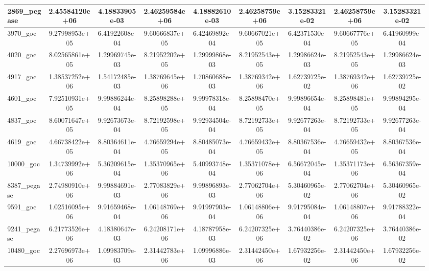\documentclass{standalone}
\begin{document}
\begin{tabular}{|l|cc|cc|cc|cc|}
2869\_pegase 
& 2.45584120e+06
& 4.18833905e-03
& 2.46259584e+06
& 4.18882610e-03
& 2.46258759e+06
& 3.15283321e-02
& 2.46258759e+06
& 3.15283321e-02
\\
\hline
3970\_goc 
& 9.27998953e+05
& 6.41922608e-04
& 9.60666837e+05
& 6.42469892e-04
& 9.60667021e+05
& 6.42371530e-04
& 9.60667776e+05
& 6.41960999e-04
\\

4020\_goc 
& 8.02565861e+05
& 1.29969745e-03
& 8.21952202e+05
& 1.29999868e-03
& 8.21952543e+05
& 1.29986624e-03
& 8.21952543e+05
& 1.29986624e-03
\\

4917\_goc 
& 1.38537252e+06
& 1.54172485e-03
& 1.38769645e+06
& 1.70860688e-03
& 1.38769342e+06
& 1.62739725e-02
& 1.38769342e+06
& 1.62739725e-02
\\

4601\_goc 
& 7.92510931e+05
& 9.99886244e-04
& 8.25898288e+05
& 9.99978318e-04
& 8.25898470e+05
& 9.99896654e-04
& 8.25898481e+05
& 9.99894295e-04
\\

4837\_goc 
& 8.60071647e+05
& 9.92673673e-04
& 8.72192598e+05
& 9.92934504e-04
& 8.72192733e+05
& 9.92677263e-04
& 8.72192733e+05
& 9.92677263e-04
\\
\hline
4619\_goc 
& 4.66738422e+05
& 8.80364611e-04
& 4.76659294e+05
& 8.80485073e-04
& 4.76659432e+05
& 8.80367536e-04
& 4.76659432e+05
& 8.80367536e-04
\\

10000\_goc 
& 1.34739992e+06
& 5.36209615e-04
& 1.35370965e+06
& 5.40993748e-04
& 1.35371078e+06
& 6.56672045e-04
& 1.35371173e+06
& 6.56367359e-04
\\

8387\_pegase 
& 2.74980910e+06
& 9.99884691e-03
& 2.77083829e+06
& 9.99896893e-03
& 2.77062704e+06
& 5.30460965e-02
& 2.77062704e+06
& 5.30460965e-02
\\

9591\_goc 
& 1.02516095e+06
& 9.91659468e-04
& 1.06148769e+06
& 9.91997903e-04
& 1.06148806e+06
& 9.91795084e-04
& 1.06148807e+06
& 9.91788322e-04
\\

9241\_pegase 
& 6.21773526e+06
& 4.18380647e-03
& 6.24208171e+06
& 4.18787958e-03
& 6.24207325e+06
& 3.76440386e-02
& 6.24207325e+06
& 3.76440386e-02
\\
\hline
10480\_goc 
& 2.27696973e+06
& 1.09983709e-03
& 2.31442783e+06
& 1.09996886e-03
& 2.31442450e+06
& 1.67932256e-02
& 2.31442450e+06
& 1.67932256e-02
\\


\end{tabular}
\end{document}
